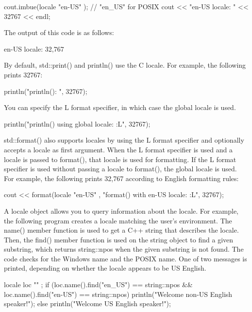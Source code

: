 \begin{cpp}
cout.imbue(locale { "en-US" }); // "en_US" for POSIX
cout << "en-US locale: " << 32767 << endl;
\end{cpp}

The output of this code is as follows:

\begin{shell}
en-US locale: 32,767
\end{shell}

By default, std::print() and println() use the C locale. For example, the following prints 32767:

\begin{cpp}
println("println(): {}", 32767);
\end{cpp}

You can specify the L format specifier, in which case the global locale is used.

\begin{cpp}
println("println() using global locale: {:L}", 32767);
\end{cpp}

std::format() also supports locales by using the L format specifier and optionally accepts a locale as first argument. When the L format specifier is used and a locale is passed to format(), that locale is used for formatting. If the L format specifier is used without passing a locale to format(), the global locale is used. For example, the following prints 32,767 according to English formatting rules:

\begin{cpp}
cout << format(locale { "en-US" }, "format() with en-US locale: {:L}", 32767);
\end{cpp}

A locale object allows you to query information about the locale. For example, the following program creates a locale matching the user’s environment. The name() member function is used to get a C++ string that describes the locale. Then, the find() member function is used on the string object to find a given substring, which returns string::npos when the given substring is not found. The code checks for the Windows name and the POSIX name. One of two messages is printed, depending on whether the locale appears to be US English.

\begin{cpp}
locale loc { "" };
if (loc.name().find("en_US") == string::npos &&
    loc.name().find("en-US") == string::npos) {
    println("Welcome non-US English speaker!");
} else {
    println("Welcome US English speaker!");
}
\end{cpp}

